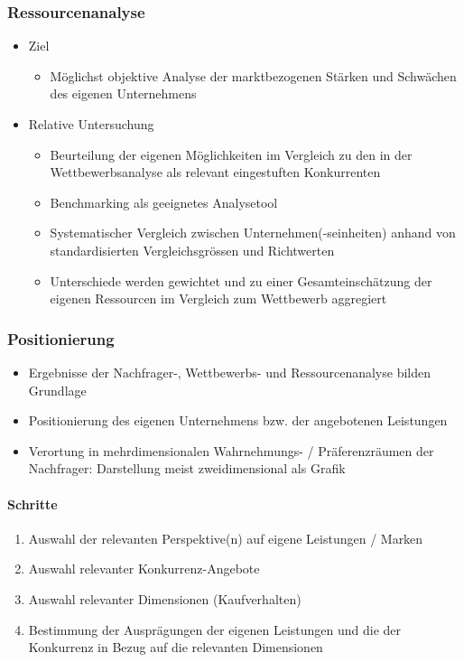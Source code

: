 \subsubsection{Ressourcenanalyse}
\begin{itemize}
	\item Ziel
	\begin{itemize}
		\item Möglichst objektive Analyse der marktbezogenen Stärken und Schwächen des eigenen Unternehmens
	\end{itemize}
	\item Relative Untersuchung
	\begin{itemize}
		\item Beurteilung der eigenen Möglichkeiten im Vergleich zu den in der Wettbewerbsanalyse als relevant eingestuften Konkurrenten
		\item Benchmarking als geeignetes Analysetool
		\item Systematischer Vergleich zwischen Unternehmen(-seinheiten) anhand von standardisierten Vergleichsgrössen und Richtwerten
		\item Unterschiede werden gewichtet und zu einer Gesamteinschätzung der eigenen Ressourcen im Vergleich zum Wettbewerb aggregiert
	\end{itemize}
\end{itemize}

\subsubsection{Positionierung}
\begin{itemize}
	\item Ergebnisse der Nachfrager-, Wettbewerbs- und Ressourcenanalyse bilden Grundlage
	\item Positionierung des eigenen Unternehmens bzw. der angebotenen Leistungen
	\item Verortung in mehrdimensionalen Wahrnehmungs- / Präferenzräumen der Nachfrager: Darstellung meist zweidimensional als Grafik
\end{itemize}

\paragraph{Schritte}
\begin{enumerate}
	\item Auswahl der relevanten Perspektive(n) auf eigene Leistungen / Marken
	\item Auswahl relevanter Konkurrenz-Angebote
	\item Auswahl relevanter Dimensionen (Kaufverhalten)
	\item Bestimmung der Ausprägungen der eigenen Leistungen und die der Konkurrenz in Bezug auf die relevanten Dimensionen
\end{enumerate}

